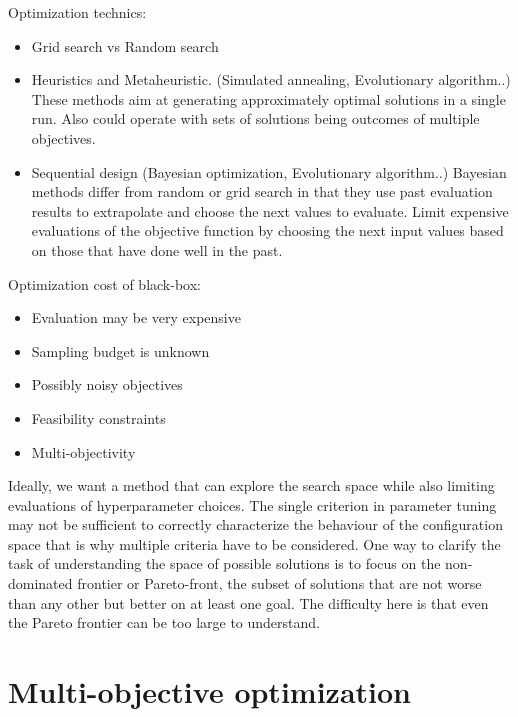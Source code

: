         Optimization technics:
        \begin{itemize}
            \item Grid search vs Random search
            \item Heuristics and Metaheuristic. (Simulated annealing, Evolutionary algorithm..) These methods aim at generating approximately optimal solutions in a single run. Also could operate with sets of solutions being outcomes of multiple objectives.
            \item Sequential design (Bayesian optimization, Evolutionary algorithm..) Bayesian methods differ from random or grid search in that they use past evaluation results to extrapolate and choose the next values to evaluate. Limit expensive evaluations of the objective function by choosing the next input values based on those that have done well in the past.
        \end{itemize}

        Optimization cost of black-box:
        \begin{itemize}
            \item Evaluation may be very expensive
            \item Sampling budget is unknown
            \item Possibly noisy objectives
            \item Feasibility constraints
            \item Multi-objectivity
        \end{itemize}

        Ideally, we want a method that can explore the search space while also limiting evaluations of hyperparameter choices. 
        The single criterion in parameter tuning may not be sufficient to correctly characterize the behaviour of the configuration space that is why multiple criteria have to be considered.
        One way to clarify the task of understanding the space of possible solutions is to focus on the non-dominated frontier or Pareto-front, the subset of solutions that are not worse than any other but better on at least one goal. The difficulty here is that even the Pareto frontier can be too large to understand. 
    

    \section{Multi-objective optimization}

